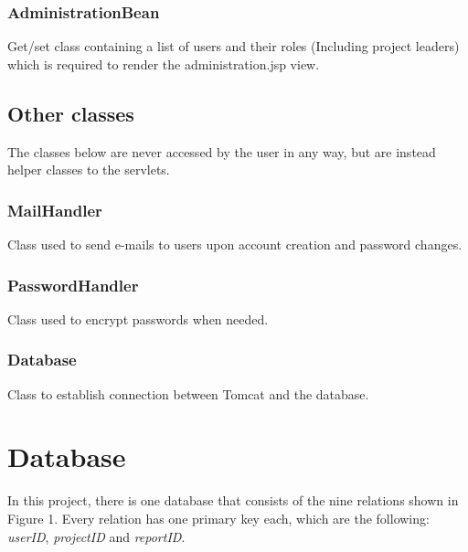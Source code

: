 \documentclass{article}
\begin{document}
\subsubsection{AdministrationBean}
Get/set class containing a list of users and their roles (Including project leaders) which is required to render the administration.jsp view.

\subsection{Other classes}
The classes below are never accessed by the user in any way, but are instead helper classes to the servlets.

\subsubsection{MailHandler}
Class used to send e-mails to users upon account creation and password changes.

\subsubsection{PasswordHandler}
Class used to encrypt passwords when needed.

\subsubsection{Database}
Class to establish connection between Tomcat and the database.

\section{Database}
In this project, there is one database that consists of the nine relations shown in Figure 1. Every relation has one primary key each, which are the following: \emph{userID}, \emph{projectID} and \emph{reportID}.
\end{document}
